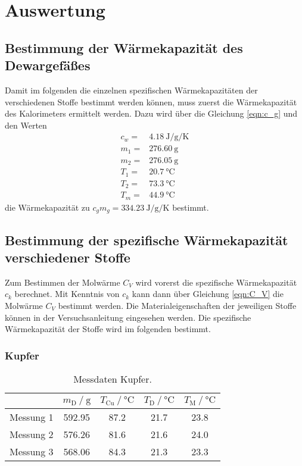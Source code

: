 \section{Auswertung}
\label{sec:Auswertung}


\subsection{Bestimmung der Wärmekapazität des Dewargefäßes}

Damit im folgenden die einzelnen spezifischen Wärmekapazitäten der verschiedenen Stoffe bestimmt werden können, muss zuerst die Wärmekapazität des Kalorimeters ermittelt werden. Dazu wird über die Gleichung \eqref{eqn:c_g} und den Werten
\begin{align*}
    c_w= & \SI{4.18}{\joule\per\g\per\kelvin} \\
    m_1= & \SI{276.60}{\g}         \\
    m_2= & \SI{276.05}{\g}         \\
    T_1= & \SI{20.7}{\celsius}    \\
    T_2= & \SI{73.3}{\celsius}    \\
    T_m= & \SI{44.9}{\celsius}  
\end{align*}
die Wärmekapazität zu $c_gm_g=\SI{334.23}{\joule\per\g\per\kelvin}$ bestimmt.

\subsection{Bestimmung der spezifische Wärmekapazität verschiedener Stoffe}
 
Zum Bestimmen der Molwärme $C_V$ wird vorerst die spezifische Wärmekapazität $c_k$ berechnet. Mit Kenntnis von $c_k$ kann dann über Gleichung \eqref{eqn:C_V} die Molwärme $C_V$ bestimmt werden. Die Materialeigenschaften der jeweiligen Stoffe können in der Versuchsanleitung \cite{V201} eingesehen werden.
Die spezifische Wärmekapazität der Stoffe wird im folgenden bestimmt.

\subsubsection{Kupfer}

\begin{table}
    \centering
    \caption{Messdaten Kupfer.}
    \begin{tabular}{c| S S S S }
        \toprule
        & $m_\text{D} \:/\: \si{\g}$ & $T_\text{Cu} \:/\: \si{\celsius}$ & $T_\text{D} \:/\: \si{\celsius}$ &  $T_\text{M}\:/\: \si{\celsius}$  \\
        \midrule
        Messung 1 & 592.95 & 87.2 & 21.7 & 23.8 \\
        Messung 2 & 576.26 & 81.6 & 21.6 & 24.0 \\
        Messung 3 & 568.06 & 84.3 & 21.3 & 23.3 \\
        \bottomrule 
    \end{tabular}
    \label{tab:k}
\end{table}

